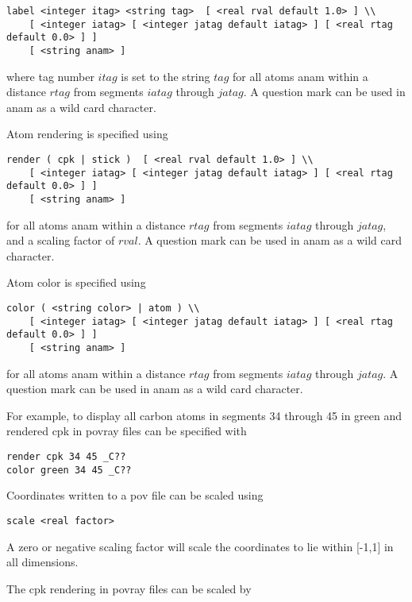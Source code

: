\begin{verbatim}
label <integer itag> <string tag>  [ <real rval default 1.0> ] \\
    [ <integer iatag> [ <integer jatag default iatag> ] [ <real rtag default 0.0> ] ]
    [ <string anam> ]
\end{verbatim}

where tag number $itag$ is set to the string $tag$ for all atoms
anam within a distance $rtag$ from segments $iatag$ through $jatag$.
A question mark can be used in anam as a wild card character.
\par

Atom rendering is specified using

\begin{verbatim}
render ( cpk | stick )  [ <real rval default 1.0> ] \\
    [ <integer iatag> [ <integer jatag default iatag> ] [ <real rtag default 0.0> ] ]
    [ <string anam> ]
\end{verbatim}

for all atoms anam within a distance $rtag$ from segments $iatag$ through $jatag$,
and a scaling factor of $rval$. A question mark can be used in anam as a wild card 
character.
\par

Atom color is specified using

\begin{verbatim}
color ( <string color> | atom ) \\
    [ <integer iatag> [ <integer jatag default iatag> ] [ <real rtag default 0.0> ] ]
    [ <string anam> ]
\end{verbatim}

for all atoms anam within a distance $rtag$ from segments $iatag$ through $jatag$.
A question mark can be used in anam as a wild card character.
\par
For example, to display all carbon atoms in segments 34 through 45 
in green and rendered cpk in povray files can be specified with

\begin{verbatim}
render cpk 34 45 _C??
color green 34 45 _C??
\end{verbatim}

Coordinates written to a pov file can be scaled using

\begin{verbatim}
scale <real factor>
\end{verbatim}

A zero or negative scaling factor will scale the coordinates to
lie within [-1,1] in all dimensions.
\par
The cpk rendering in povray files can be scaled by

